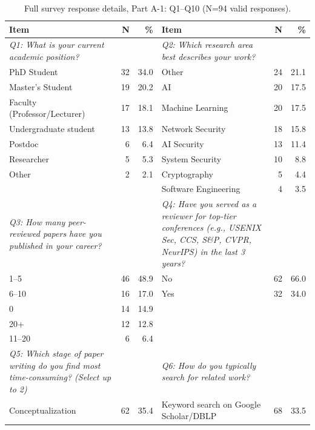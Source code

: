 \begin{table}[htbp]
  \centering
  \begin{threeparttable}
    \caption{Full survey response details, Part A-1: Q1--Q10 (N=94 valid responses).}
    \label{tab:survey_details_full_a1}
    \small
    \begin{tabular}{p{6cm}rr|p{6cm}rr}
\toprule
\textbf{Item} & \textbf{N} & \textbf{\%} & \textbf{Item} & \textbf{N} & \textbf{\%} \\
\midrule
\textit{Q1: What is your current academic position?} & & & \textit{Q2: Which research area best describes your work?} & & \\
\rowcolor{tableRowLight}
PhD Student & 32 & 34.0 & Other & 24 & 21.1 \\
Master's Student & 19 & 20.2 & AI & 20 & 17.5 \\
\rowcolor{tableRowLight}
Faculty (Professor/Lecturer) & 17 & 18.1 & Machine Learning & 20 & 17.5 \\
Undergraduate student & 13 & 13.8 & Network Security & 18 & 15.8 \\
\rowcolor{tableRowLight}
Postdoc & 6 & 6.4 & AI Security & 13 & 11.4 \\
Researcher & 5 & 5.3 & System Security & 10 & 8.8 \\
\rowcolor{tableRowLight}
Other & 2 & 2.1 & Cryptography & 5 & 4.4 \\
 &  &  & Software Engineering & 4 & 3.5 \\
\midrule
\textit{Q3: How many peer-reviewed papers have you published in your career?} & & & \textit{Q4: Have you served as a reviewer for top-tier conferences (e.g., USENIX Sec, CCS, S\&P, CVPR, NeurIPS) in the last 3 years?} & & \\
\rowcolor{tableRowLight}
1--5 & 46 & 48.9 & No & 62 & 66.0 \\
6--10 & 16 & 17.0 & Yes & 32 & 34.0 \\
\rowcolor{tableRowLight}
0 & 14 & 14.9 &  &  &  \\
20+ & 12 & 12.8 &  &  &  \\
\rowcolor{tableRowLight}
11--20 & 6 & 6.4 &  &  &  \\
\midrule
\textit{Q5: Which stage of paper writing do you find most time-consuming? (Select up to 2)} & & & \textit{Q6: How do you typically search for related work?} & & \\
\rowcolor{tableRowLight}
Conceptualization & 62 & 35.4 & Keyword search on Google Scholar/DBLP & 68 & 33.5 \\

\end{tabular}
\end{threeparttable}
\end{table}
